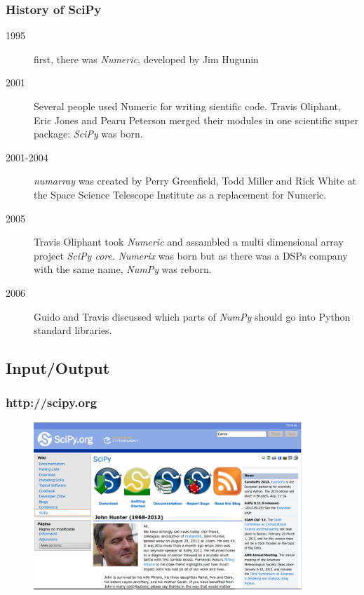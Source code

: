 \documentclass[10pt,colorlinks]{beamer}
\begin{document}
\begin{frame}[fragile]\frametitle{History of SciPy}
  \begin{description}
    \item[1995] first, there was \emph{Numeric}, developed by Jim Hugunin
    \item[2001] Several people used Numeric for writing sientific code.  Travis Oliphant, Eric Jones and Pearu Peterson merged their modules in one scientific super package: \emph{SciPy} was born.
    \item[2001-2004] \emph{numarray} was created by Perry Greenfield, Todd Miller and Rick White at the Space Science Telescope Institute as a replacement for Numeric.
    \item[2005] Travis Oliphant took \emph{Numeric} and assambled a multi dimensional array project \emph{SciPy core}. \emph{Numerix} was born but as there was a DSPs company with the same name, \emph{NumPy} was reborn. 
    \item[2006] Guido and Travis discussed which parts of \emph{NumPy} should go into Python standard libraries.  
  \end{description}
\end{frame}

\subsection{Input/Output}

\begin{frame}[fragile]\frametitle{http://scipy.org}
\begin{figure}[!htb]
    \centering
    \includegraphics[width=0.9\textwidth]{figs/scipy}
\end{figure}
\end{frame}
\end{document}
